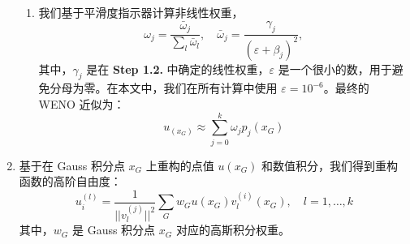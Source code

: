 \documentclass{article}
\numberwithin{equation}{subsection}    %
\begin{document}
\begin{enumerate}[label={{\bf Step \arabic*}:}]
\begin{enumerate}[label={\bf Step 1.\arabic*.}]
              \item 我们基于平滑度指示器计算非线性权重，
                    \begin{equation}
                        \omega_{j}=\frac{\bar{\omega}_{j}}{\sum_{l} \bar{\omega}_{l}}, \quad \bar{\omega}_{j}=\frac{\gamma_{j}}{\left(\varepsilon+\beta_{j}\right)^{2}},
                    \end{equation}
                    其中，$\gamma_j$ 是在 {\bf Step 1.2.} 中确定的线性权重，$\varepsilon$ 是一个很小的数，用于避免分母为零。在本文中，我们在所有计算中使用 $\varepsilon=10^{-6}$。最终的 WENO 近似为：
                    \begin{equation}
                        u_{(x_G)} \approx \sum_{j=0}^{k} \omega_{j} p_{j}\left(x_{G}\right)
                    \end{equation}
          \end{enumerate}
    \item 基于在 Gauss 积分点 $x_G$ 上重构的点值 $u(x_G)$ 和数值积分，我们得到重构函数的高阶自由度：
          \begin{equation}
              u_{i}^{(l)}=\frac{1}{||v_{l}^{(j)}||^2} \sum_{G} w_{G} u\left(x_{G}\right) v_{l}^{(i)}\left(x_{G}\right), \quad l=1, \ldots, k
          \end{equation}
          其中，$w_{G}$ 是 Gauss 积分点 $x_{G}$ 对应的高斯积分权重。
\end{enumerate}
\end{document}
